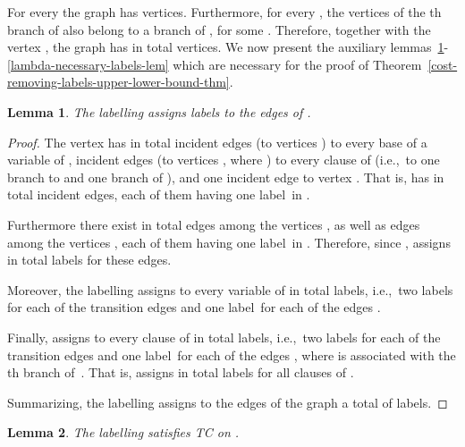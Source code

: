 \documentclass[a4paper,UKenglish]{article}
\newtheorem{lemma}{Lemma}
\begin{document}
For every  the graph  has 
vertices. Furthermore, for every , the  vertices of the th branch of  also belong to a branch of , for
some . Therefore, together with the vertex , the graph  has in total  vertices. We now present the auxiliary
lemmas~\ref{total-number-labels-lem}-\ref{lambda-necessary-labels-lem} which
are necessary for the proof of Theorem~\ref {cost-removing-labels-upper-lower-bound-thm}.


\begin{lemma}
\label{total-number-labels-lem}
The labelling  assigns  labels to the edges of .
\end{lemma}

\begin{proof}
The vertex  has in total  incident edges (to vertices ) to every base of a variable 
of ,  incident edges (to vertices , where ) to every
clause  of  (i.e.,~to one branch to  and
one branch of ), and one incident edge to vertex .
That is,  has in total  incident edges, each of them having one label~in .

Furthermore there exist in total  edges among the
vertices , as well as  edges among the vertices , each of them having one label~in . Therefore, since ,  assigns in total  labels for these edges.

Moreover, the labelling  assigns to every variable 
of  in total  labels, i.e.,~two labels for each of the transition
edges  and one
label~for each of the edges .

Finally,  assigns to every clause  of 
 in total  labels, i.e.,~two labels for each of the transition
edges  and one
label~for each of the edges , where  is
associated with the th branch of~. That is,  assigns in total  labels for all clauses of .

Summarizing, the labelling  assigns to the edges of the graph  a total of
 labels.
\end{proof}




\begin{lemma}
\label{lambda-reachabilities-preserve-lem}
The labelling  satisfies TC on .
\end{lemma}
\end{document}
